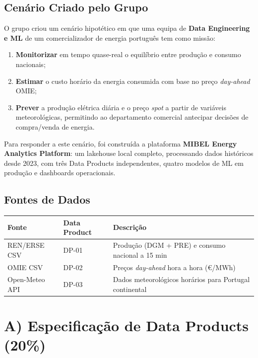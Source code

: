 \documentclass[11pt,a4paper]{article}
\begin{document}
\subsection{Cenário Criado pelo Grupo}

O grupo criou um cenário hipotético em que uma equipa de \textbf{Data Engineering e ML} de um comercializador de energia português tem como missão:

\begin{enumerate}[leftmargin=*]
  \item \textbf{Monitorizar} em tempo quase-real o equilíbrio entre produção e consumo nacionais;
  \item \textbf{Estimar} o custo horário da energia consumida com base no preço \textit{day-ahead} OMIE;
  \item \textbf{Prever} a produção elétrica diária e o preço \textit{spot} a partir de variáveis meteorológicas, permitindo ao departamento comercial antecipar decisões de compra/venda de energia.
\end{enumerate}

Para responder a este cenário, foi construída a plataforma \textbf{MIBEL Energy Analytics Platform}: um lakehouse local completo, processando dados históricos desde 2023, com três Data Products independentes, quatro modelos de ML em produção e dashboards operacionais.

\subsection{Fontes de Dados}

\begin{table}[h!]
\centering
\begin{tabularx}{\linewidth}{llX}
\toprule
\textbf{Fonte} & \textbf{Data Product} & \textbf{Descrição} \\
\midrule
REN/ERSE CSV & DP-01 & Produção (DGM + PRE) e consumo nacional a 15 min \\
OMIE CSV & DP-02 & Preços \textit{day-ahead} hora a hora (€/MWh) \\
Open-Meteo API & DP-03 & Dados meteorológicos horários para Portugal continental \\
\bottomrule
\end{tabularx}
\end{table}

\section{A) Especificação de Data Products (20\%)}
\end{document}
